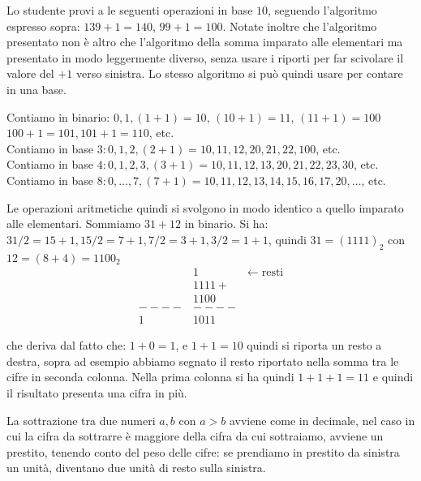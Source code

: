 Lo studente provi a le seguenti operazioni in base $10$, seguendo l'algoritmo
espresso sopra: $139+1 = 140$, $99+1 = 100$. Notate inoltre che l'algoritmo presentato non è altro che l'algoritmo della somma imparato alle elementari ma presentato in modo leggermente diverso, senza usare i riporti per far scivolare
il valore del $+1$ verso sinistra. Lo stesso algoritmo si può quindi usare per contare in una base.
\begin{ex}\label{ex:somma}
Contiamo in binario: $0, 1, (1+1) = 10$, $(10+1) = 11$, $(11+1) = 100$
$100+1 = 101, 101+1 = 110$, etc.\\
Contiamo in base $3: 0,1,2,(2+1)=10,11,12,20,21,22,100$, etc.\\
Contiamo in base $4: 0,1,2,3, (3+1) = 10, 11,12,13,20,21,22,23,30$, etc.\\
Contiamo in base $8: 0,\ldots,7, (7+1)=10,11,12,13,14,15,16,17,20,\ldots$, etc.

Le operazioni aritmetiche quindi si svolgono in modo identico a quello imparato
alle elementari. Sommiamo $31+12$ in binario. Si ha: $31/2 = 15 + 1, 15/2 = 7 + 1, 7/2 = 3 + 1, 3 /2 = 1 + 1$, quindi $31 = (1111)_2$ con $12 = (8+4) = 1100_2$
\begin{align*}
    &1\qquad \qquad \leftarrow\text{resti}\\
	&1111+\\
	&1100\\
----&----\\
   1&1011
\end{align*}
\end{ex}

che deriva dal fatto che: $1+0 = 1$, e $1+1 = 10$ quindi si riporta un resto
a destra, sopra ad esempio abbiamo segnato il resto riportato nella somma tra le cifre in seconda colonna. Nella prima colonna si ha quindi $1+1+1 = 11$ e quindi il risultato presenta una cifra in più.

La sottrazione tra due numeri $a,b$ con $a>b$
avviene come in decimale, nel caso in cui la cifra da sottrarre è maggiore
della cifra da cui sottraiamo, avviene un prestito, tenendo conto del peso
delle cifre: se prendiamo in prestito da sinistra un unità, diventano due unità
di resto sulla sinistra.

